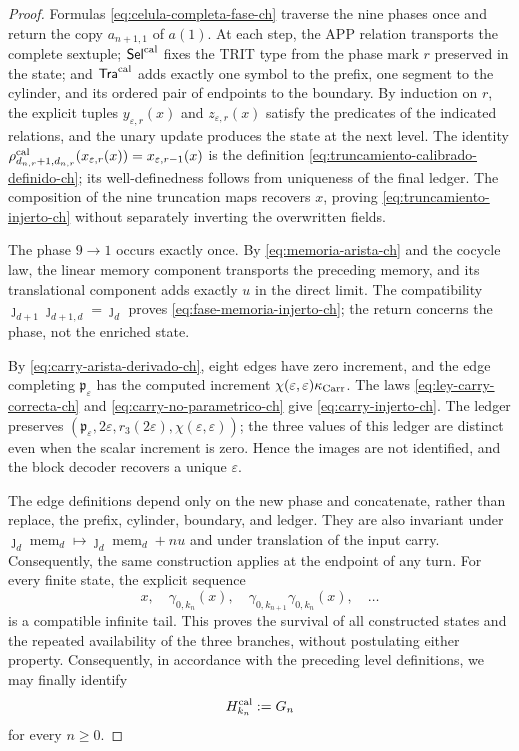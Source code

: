 \begin{proof}
Formulas \eqref{eq:celula-completa-fase-ch} traverse the nine phases once and
return the copy \(a_{n+1,1}\) of \(a(1)\). At each step, the APP relation
transports the complete sextuple; \(\mathsf{Sel}^{\rm cal}\) fixes the TRIT
type from the phase mark \(r\) preserved in the state; and
\(\mathsf{Tra}^{\rm cal}\) adds exactly one symbol to the prefix, one segment
to the cylinder, and its ordered pair of endpoints to the boundary. By
induction on \(r\), the explicit tuples \(y_{\varepsilon,r}(x)\) and
\(z_{\varepsilon,r}(x)\) satisfy the predicates of the indicated relations,
and the unary update produces the state at the next level. The identity
\(\rho^{\rm cal}_{d_{n,r}+1,d_{n,r}}
(x_{\varepsilon,r}(x))=x_{\varepsilon,r-1}(x)\) is the definition
\eqref{eq:truncamiento-calibrado-definido-ch}; its well-definedness follows
from uniqueness of the final ledger. The composition of the nine truncation
maps recovers \(x\), proving \eqref{eq:truncamiento-injerto-ch} without
separately inverting the overwritten fields.

The phase \(9\to1\) occurs exactly once. By
\eqref{eq:memoria-arista-ch} and the cocycle law, the linear memory component
transports the preceding memory, and its translational component adds exactly
\(u\) in the direct limit. The compatibility
\(\jmath_{d+1}\jmath_{d+1,d}=\jmath_d\) proves
\eqref{eq:fase-memoria-injerto-ch}; the return concerns the phase, not the
enriched state.

By \eqref{eq:carry-arista-derivado-ch}, eight edges have zero increment, and
the edge completing \(\mathfrak p_\varepsilon\) has the computed increment
\(\chi(\varepsilon,\varepsilon)\kappa_{\rm Carr}\). The laws
\eqref{eq:ley-carry-correcta-ch} and
\eqref{eq:carry-no-parametrico-ch}
give \eqref{eq:carry-injerto-ch}. The ledger preserves
\((\mathfrak p_\varepsilon,2\varepsilon,r_3(2\varepsilon),
\chi(\varepsilon,\varepsilon))\); the three values of this ledger are
distinct even when the scalar increment is zero. Hence the images are not
identified, and the block decoder recovers a unique \(\varepsilon\).

The edge definitions depend only on the new phase and concatenate, rather than
replace, the prefix, cylinder, boundary, and ledger. They are also invariant
under
\(\jmath_d\operatorname{mem}_d\mapsto
  \jmath_d\operatorname{mem}_d+nu\)
and under translation of the input carry. Consequently, the same construction
applies at the endpoint of any turn. For every finite state, the explicit
sequence
\[
 x,\quad\gamma_{0,k_n}(x),\quad
 \gamma_{0,k_{n+1}}\gamma_{0,k_n}(x),\quad\ldots
\]
is a compatible infinite tail. This proves the survival of all constructed
states and the repeated availability of the three branches, without
postulating either property. Consequently, in accordance with the preceding
level definitions, we may finally identify
\begin{equation}
 H_{k_n}^{\rm cal}:=G_n
 \label{eq:subarbol-calibrado-superviviente-ch}
\end{equation}
for every \(n\ge0\).
\end{proof}

